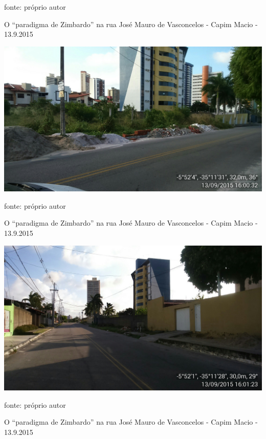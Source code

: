 \documentclass[
	12pt,				%
	openright,			%
	twoside,			%
	a4paper,			%
	chapter=TITLE,		%
	section=TITLE,		%
	subsection=TITLE,	%
	subsubsection=TITLE,%
	spanish,            %
	english,			%
	brazil				%
	]{abntex2}
\begin{document}
\begin{anexosenv}
\begin{foto}[!htpb]
\begin{center}
	\end{center}
	\ABNTEXchapterfont\small{fonte: próprio autor}
\end{foto}

\begin{foto}[!htpb]
	\caption{\label{FotoJ}O “paradigma de Zimbardo” na rua José Mauro de Vasconcelos - Capim Macio - 13.9.2015}
	\begin{center}
		\includegraphics[scale=0.23]{Mauro2.jpg}
	\end{center}
	\ABNTEXchapterfont\small{fonte: próprio autor}
\end{foto}
\begin{foto}[!htpb]
	\caption{\label{FotoK}O “paradigma de Zimbardo” na rua José Mauro de Vasconcelos - Capim Macio - 13.9.2015}
	\begin{center}
		\includegraphics[scale=0.23]{Mauro3.jpg}
	\end{center}
	\ABNTEXchapterfont\small{fonte: próprio autor}
\end{foto}
\begin{foto}[!htpb]
	\caption{\label{FotoL}O “paradigma de Zimbardo” na rua José Mauro de Vasconcelos - Capim Macio - 13.9.2015}

\end{foto}
\end{anexosenv}
\end{document}
